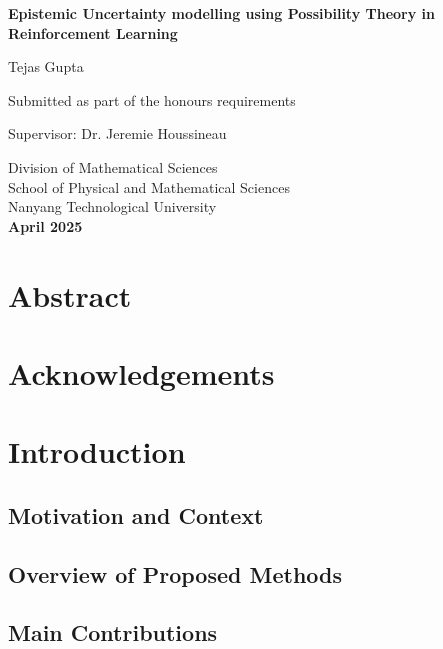 \documentclass[12pt,a4paper]{report}
\begin{document}
\begin{titlepage}
    \centering
    \vspace*{3cm}
    {\Huge\bfseries Epistemic Uncertainty modelling using Possibility Theory in Reinforcement Learning \par}
    \vspace{2cm}
    {\Large Tejas Gupta \par}
    \vspace{1.5cm}
    Submitted as part of the honours requirements \par
    \vspace{1cm}
    Supervisor: Dr. Jeremie Houssineau \par
    \vfill
    Division of Mathematical Sciences \\
    School of Physical and Mathematical Sciences \\
    Nanyang Technological University \\
    \vspace{1cm}
    \textbf{April 2025}
\end{titlepage}

\chapter*{Abstract}

\chapter*{Acknowledgements}

\tableofcontents

\chapter{Introduction}
\section{Motivation and Context}
\section{Overview of Proposed Methods}
\section{Main Contributions}
\end{document}
